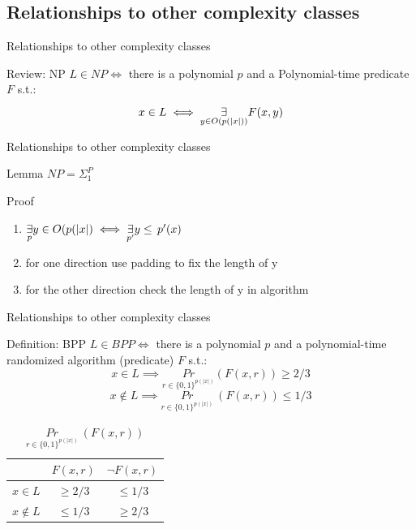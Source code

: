     \subsection{Relationships to other  complexity classes}
        \begin{frame}{Relationships to other complexity classes}  
            \begin{block}{Review: NP}
                $L \in NP \iff $ there is a polynomial $p$ and a Polynomial-time predicate $F$ s.t.:
                $$x \in L \iff \overset{{}}{\underset{{y \in O(p(|x|))}}{\Large \exists}} F(x,y)$$
            \end{block}
        \end{frame}
        \begin{frame}{Relationships to other  complexity classes}
            \begin{block}{Lemma}
                $NP = \Sigma_1^P$
            \end{block}
            \begin{block}{Proof}
                \begin{enumerate}
                    \item $\overset{{}}{\underset{{p}}{\Large \exists}}  y \in O(p(|x|) \iff \overset{{}}{\underset{{p'}}{\Large \exists}}  y\leq  \, p'(x)$
                    \item  for one direction use padding to fix the length of y
                    \item for the other direction check the length of y in algorithm
                \end{enumerate}                
            \end{block}
        \end{frame}
        
        \begin{frame}{Relationships to other  complexity classes} 
            \begin{block}{Definition: BPP}
                $L \in BPP \iff $ there is a polynomial $p$ and a polynomial-time randomized algorithm (predicate) $F$ s.t.:
                $$x \in L \implies \underset{r\in \{0,1\}^{p(|x|)}}{Pr}(F(x,r)) \geq 2/3$$
                $$x \notin L \implies \underset{r\in \{0,1\}^{p(|x|)}}{Pr}\ (F(x,r)) \leq 1/3$$
            \end{block}
            \begin{table}
                \centering
                \begin{tabular}{rcc}
                     & $F(x,r)$ & $\neg F(x,r)$ \\\hline
                    $x \in L$ & \(\geq 2/3\) & \(\leq 1/3\) \\
                    $x \notin L$ & \(\leq 1/3\) & \(\geq 2/3\) \\
                \end{tabular}
                \caption{$\underset{r\in \{0,1\}^{p(|x|)}}{Pr}\ (F(x,r))$}
                \label{BPP DEF}
            \end{table}
        \end{frame}
        
